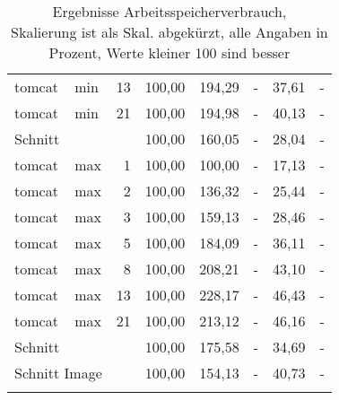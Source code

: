 \begin{footnotesize}
\begin{longtable}{llrrrrrr}
		tomcat         & min     & 13         & 100,00 & 194,29                      & -                           & 37,61                       & -                           \\
		tomcat         & min     & 21         & 100,00 & 194,98                      & -                           & 40,13                       & -                           \\ \hline
		Schnitt        &         &            & 100,00 & 160,05                      & -                           & 28,04                       & -                           \\ \hline
		tomcat         & max     & 1          & 100,00 & \cellcolor[HTML]{C0C0C0}100,00 & -                           & 17,13                       & -                           \\
		tomcat         & max     & 2          & 100,00 & 136,32                      & -                           & 25,44                       & -                           \\
		tomcat         & max     & 3          & 100,00 & 159,13                      & -                           & 28,46                       & -                           \\
		tomcat         & max     & 5          & 100,00 & 184,09                      & -                           & 36,11                       & -                           \\
		tomcat         & max     & 8          & 100,00 & 208,21                      & -                           & 43,10                       & -                           \\
		tomcat         & max     & 13         & 100,00 & 228,17                      & -                           & 46,43                       & -                           \\
		tomcat         & max     & 21         & 100,00 & 213,12                      & -                           & 46,16                       & -                           \\ \hline
		Schnitt        &         &            & 100,00 & 175,58                      & -                           & 34,69                       & -                           \\ \hline
		\multicolumn{2}{l}{Schnitt Image} &            & 100,00 & 154,13                      & -                           & 40,73                       & -                           \\ \hline
		\caption[Ergebnisse Arbeitsspeicherverbrauch]{Ergebnisse Arbeitsspeicherverbrauch, \\\hspace{\textwidth} \footnotesize Skalierung ist als Skal. abgekürzt, alle Angaben in Prozent,  Werte kleiner 100 sind besser}
		\label{tbl:ramdetailauswertung}
	\end{longtable}
\end{footnotesize}

